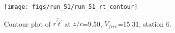 \begin{figure}[H]
\centering
\texttt{[image: figs/run\_51/run\_51\_rt\_contour]}
\caption{Contour plot of $\overline{r^\prime t^\prime}$ at $z/c$=9.50, $V_{free}$=15.31, station 6.}
\label{fig:run_51_rt_contour}
\end{figure}


